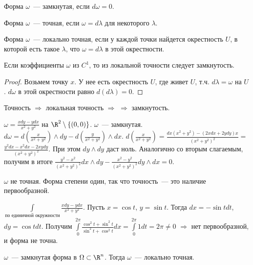 \begin{definition}
    Форма $\omega$~--- замкнутая, если $d \omega = 0$.

    Форма $\omega$~--- точная, если $\omega = d \lambda$ для некоторого $\lambda$.

    Форма $\omega$~--- локально точная, если у каждой точки найдется окрестность $U$, в которой есть такое $\lambda$, что
    $\omega = d \lambda$ в этой окрестности.
\end{definition}

\begin{theorem}
    Если коэффициенты $\omega$ из $C^1$, то из локальной точности следует замкнутость.
\end{theorem}

\begin{proof}
    Возьмем точку $x$. У нее есть окрестность $U$, где живет $U$, т.ч. $d \lambda = \omega$ на $U$.
    $d \omega$ в этой окрестности равно $d(d \lambda) = 0$.
\end{proof}

\begin{observation}
    Точность $\Rightarrow$ локальная точность $\Rightarrow$  $\Rightarrow$ замкнутость.
\end{observation}

\begin{example}
    $\omega = \frac{x dy - y dx}{x^2 + y^2}$ на $\R^2 \setminus \{(0, 0)\}$. $\omega$~--- замкнутая.
    $d \omega = d(\frac{x}{x^2 + y^2}) \wedge d y - d(\frac{y}{x^2 + y^2}) \wedge dx$.
    $d(\frac{x}{x^2 + y^2}) = \frac{dx (x^2 + y^2) - (2 x dx + 2 y dy) x}{(x^2 + y^2)^2} = $
    $\frac{y^2 dx - x^2 dx - 2xy dy}{(x^2 + y^2)^2}$. При этом $dy \wedge dy$ даст ноль.
    Аналогично со вторым слагаемым, получим в итоге
    $\frac{y^2 - x^2}{(x^2 + y^2)^2} dx \wedge dy - \frac{x^2 - y^2}{(x^2 + y^2)^2} dy \wedge dx = 0$.

    $\omega$ не точная. Форма степени один, так что точность~--- это наличие первообразной.

    $\int \limits_{\texttt{по единичной окружности}} \frac{x dy - y dx}{x^2 + y^2}$.
    Пусть $x = \cos t$, $y = \sin t$. Тогда $dx = -\sin t dt$, $dy = \cos t dt$.
    Получим $\int \limits_{0}^{2 \pi} \frac{\cos^2t + \sin^2 t}{\sin^2 t + \cos^2 t} dx = \int \limits_{0}^{2 \pi} 1 dt = 2 \pi \neq 0$
    $\Rightarrow $ нет первообразной, и форма не точна.
\end{example}

\begin{theorem}
    $\omega$~--- замкнутая форма в $\Omega \subset \R^n$. Тогда $\omega$~--- локально точная.
\end{theorem}

